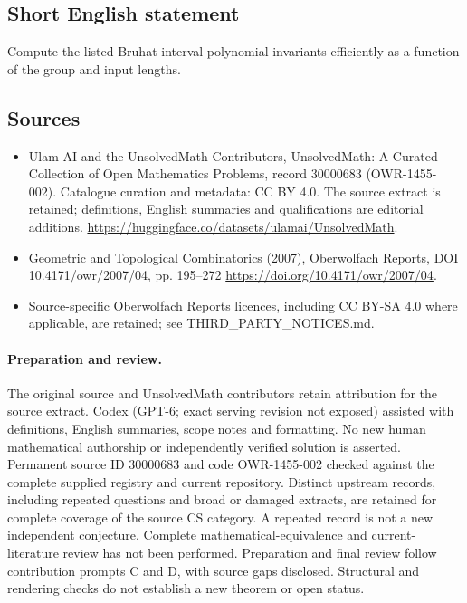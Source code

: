 \documentclass[11pt]{article}
\begin{document}
\subsection{Short English statement}
Compute the listed Bruhat-interval polynomial invariants efficiently as a function of the group and input lengths.
\subsection{Sources}
\begin{itemize}
\item[\hypertarget{source:30000683:1}{S1}] Ulam AI and the UnsolvedMath Contributors, UnsolvedMath: A Curated Collection of Open Mathematics Problems, record 30000683 (OWR-1455-002). Catalogue curation and metadata: CC BY 4.0. The source extract is retained; definitions, English summaries and qualifications are editorial additions.
\url{https://huggingface.co/datasets/ulamai/UnsolvedMath}.
\item[\hypertarget{source:30000683:2}{S2}] Geometric and Topological Combinatorics (2007), Oberwolfach Reports, DOI 10.4171/owr/2007/04, pp. 195--272
\url{https://doi.org/10.4171/owr/2007/04}.
\item Source-specific Oberwolfach Reports licences, including CC BY-SA 4.0 where applicable, are retained; see THIRD\_PARTY\_NOTICES.md.
\end{itemize}
\paragraph{Preparation and review.}
The original source and UnsolvedMath contributors retain attribution for the source extract. Codex (GPT-6; exact serving revision not exposed) assisted with definitions, English summaries, scope notes and formatting. No new human mathematical authorship or independently verified solution is asserted. Permanent source ID 30000683 and code OWR-1455-002 checked against the complete supplied registry and current repository. Distinct upstream records, including repeated questions and broad or damaged extracts, are retained for complete coverage of the source CS category. A repeated record is not a new independent conjecture. Complete mathematical-equivalence and current-literature review has not been performed. Preparation and final review follow contribution prompts C and D, with source gaps disclosed. Structural and rendering checks do not establish a new theorem or open status.
\label{end:30000683}
\end{document}
